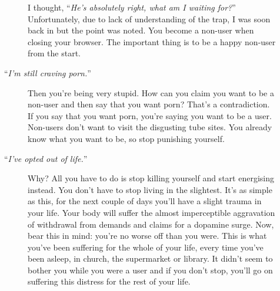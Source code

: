 \documentclass[
]{book}
\begin{document}
\begin{description}
\begin{description}
I thought, ``\emph{He's absolutely right, what am I waiting for?}'' Unfortunately, due to lack of understanding of the trap, I was soon back in but the point was noted. You become a non-user when closing your browser. The important thing is to be a happy non-user from the start.
\item[``\emph{I'm still craving porn.}'']
Then you're being very stupid. How can you claim you want to be a non-user and then say that you want porn? That's a contradiction. If you say that you want porn, you're saying you want to be a user. Non-users don't want to visit the disgusting tube sites. You already know what you want to be, so stop punishing yourself.
\item[``\emph{I've opted out of life.}'']
Why? All you have to do is stop killing yourself and start energising instead. You don't have to stop living in the slightest. It's as simple as this, for the next couple of days you'll have a slight trauma in your life. Your body will suffer the almost imperceptible aggravation of withdrawal from demands and claims for a dopamine surge. Now, bear this in mind: you're no worse off than you were. This is what you've been suffering for the whole of your life, every time you've been asleep, in church, the supermarket or library. It didn't seem to bother you while you were a user and if you don't stop, you'll go on suffering this distress for the rest of your life.


\end{description}
\end{description}
\end{document}
